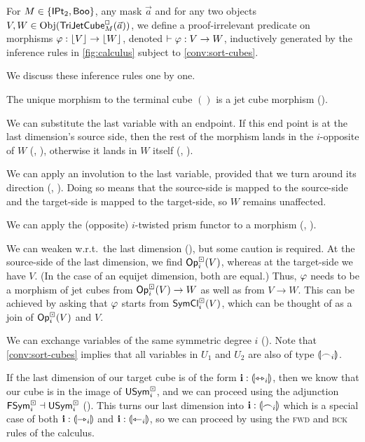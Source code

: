 \documentclass[a4paper]{memoir}
\begin{document}
\begin{definition} \label{def:calculus}
	For $M \in \mathopen{}\left\{ {\mathsf{IPt}_2}, \mathsf{Boo} \right\}\mathclose{}$, any mask $\vec a$ and for any two objects $V, W \in \mathrm{Obj}(\mathsf{TriJetCube}^{\Box}_{M}\mathopen{}\left( \vec a \right)\mathclose{})$, we define a proof-irrelevant predicate on morphisms $\varphi : \mathopen{}\left\lfloor V \right\rfloor\mathclose{} \to \mathopen{}\left\lfloor W \right\rfloor\mathclose{}$, denoted $\vdash \varphi : V \to W$, inductively generated by the inference rules in \cref{fig:calculus} subject to \cref{conv:sort-cubes}.
\end{definition}
We discuss these inference rules one by one.

The unique morphism to the terminal cube $()$ is a jet cube morphism ().

We can substitute the last variable with an endpoint. If this end point is at the last dimension's source side, then the rest of the morphism lands in the $i$-opposite of $W$ (, ), otherwise it lands in $W$ itself (, ).

We can apply an involution to the last variable, provided that we turn around its direction (, ). Doing so means that the source-side is mapped to the source-side and the target-side is mapped to the target-side, so $W$ remains unaffected.

We can apply the (opposite) $i$-twisted prism functor to a morphism (, ).

We can weaken w.r.t.\ the last dimension (), but some caution is required. At the source-side of the last dimension, we find ${\mathsf{Op}}^\boxdot_i(V)$, whereas at the target-side we have $V$. (In the case of an equijet dimension, both are equal.)
Thus, $\varphi$ needs to be a morphism of jet cubes from ${\mathsf{Op}}^\boxdot_i(V) \to W$ as well as from $V \to W$.
This can be achieved by asking that $\varphi$ starts from $\mathsf{SymCl}^\boxdot_i(V)$, which can be thought of as a join of ${\mathsf{Op}}^\boxdot_i(V)$ and $V$.

We can exchange variables of the same symmetric degree $i$ ().
Note that \cref{conv:sort-cubes} implies that all variables in $U_1$ and $U_2$ are also of type ${\llparenthesis \frown_i \rrparenthesis}$.

If the last dimension of our target cube is of the form $\mathbf{i} : {\llparenthesis \leftrightarrowtriangle_i \rrparenthesis}$, then we know that our cube is in the image of $\mathsf{USym}^\boxdot_i$, and we can proceed using the adjunction $\mathsf{FSym}^\boxdot_i \dashv \mathsf{USym}^\boxdot_i$ ().
This turns our last dimension into $\mathbf{i} : {\llparenthesis \frown_i \rrparenthesis}$ which is a special case of both $\mathbf{i} : {\llparenthesis \rightarrowtriangle_i \rrparenthesis}$ and $\mathbf{i} : {\llparenthesis \leftarrowtriangle_i \rrparenthesis}$, so we can proceed by using the \textsc{fwd} and \textsc{bck} rules of the calculus.
\end{document}
